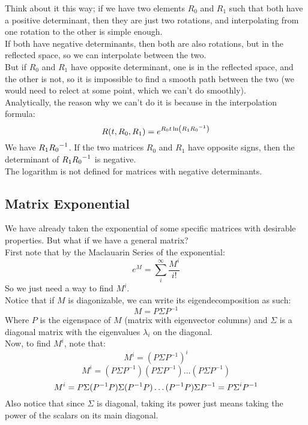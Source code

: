 \documentclass[12pt]{article}
\begin{document}
Think about it this way;
if we have two elements $R_0$ and $R_1$
such that both have a positive determinant,
then they are just two rotations,
and interpolating from one rotation to the other
is simple enough. \\
If both have negative determinants,
then both are also rotations,
but in the reflected space,
so we can interpolate between the two. \\
But if $R_0$ and $R_1$ have opposite determinant,
one is in the reflected space,
and the other is not, so it is impossible
to find a smooth path between the two
(we would need to relect at some point,
which we can't do smoothly). \\

Analytically,
the reason why we can't do it is because
in the interpolation formula:
\[ R(t,R_0,R_1) = 
e^{{R_0t\ln\left( {R_1}{R_0}^{-1} \right)}} \]
We have ${R_1}{R_0}^{-1}$.
If the two matrices $R_0$ and $R_1$ have opposite
signs, then the determinant of ${R_1}{R_0}^{-1}$
is negative. \\
The logarithm is not defined for matrices
with negative determinants. \\

\newpage

\subsection*{Matrix Exponential}

We have already taken the exponential of some
specific matrices with desirable properties. 
But what if we have a general matrix? \\

First note that by the Maclauarin Series
of the exponential:
\[ e^{M} = \sum_i^\infty \dfrac{M^i}{i!} \]
So we just need a way to find $M^i$. \\

Notice that if $M$ is diagonizable,
we can write its eigendecomposition as such:
\[ M = P\Sigma P^{-1} \]
Where $P$ is the eigenspace of $M$
(matrix with eigenvector columns)
and $\Sigma$ is a diagonal matrix
with the eigenvalues $\lambda_i$
on the diagonal. \\

Now, to find $M^i$, note that:
\[ M^i = (P\Sigma P^{-1})^i \]
\[ M^i = (P\Sigma P^{-1})(P\Sigma P^{-1})\dots
(P\Sigma P^{-1})\]
\[ M^i = P\Sigma (P^{-1}P)\Sigma (P^{-1}P) \dots
(P^{-1}P)\Sigma P^{-1} = P\Sigma^i P^{-1} \]
Also notice that since $\Sigma$
is diagonal, taking its power just means
taking the power of the scalars on its main
diagonal. \\
\end{document}
